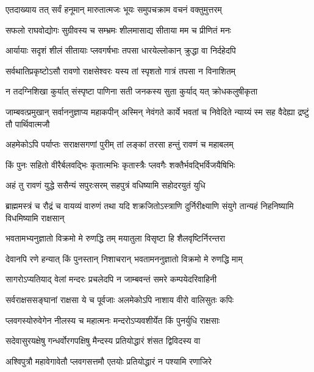 
\twolineshloka
{एतदाख्याय तत् सर्वं हनूमान् मारुतात्मजः}
{भूयः समुपचक्राम वचनं वक्तुमुत्तरम्} %

\twolineshloka
{सफलो राघवोद्योगः सुग्रीवस्य च सम्भ्रमः}
{शीलमासाद्य सीताया मम च प्रीणितं मनः} %

\twolineshloka
{आर्यायाः सदृशं शीलं सीतायाः प्लवगर्षभाः}
{तपसा धारयेल्लोकान् क्रुद्धा वा निर्दहेदपि} %

\twolineshloka
{सर्वथातिप्रकृष्टोऽसौ रावणो राक्षसेश्वरः}
{यस्य तां स्पृशतो गात्रं तपसा न विनाशितम्} %

\twolineshloka
{न तदग्निशिखा कुर्यात् संस्पृष्टा पाणिना सती}
{जनकस्य सुता कुर्याद् यत् क्रोधकलुषीकृता} %

\threelineshloka
{जाम्बवत्प्रमुखान् सर्वाननुज्ञाप्य महाकपीन्}
{अस्मिन् नेवंगते कार्ये भवतां च निवेदिते}
{न्याय्यं स्म सह वैदेह्या द्रष्टुं तौ पार्थिवात्मजौ} %

\twolineshloka
{अहमेकोऽपि पर्याप्तः सराक्षसगणां पुरीम्}
{तां लङ्कां तरसा हन्तुं रावणं च महाबलम्} %

\twolineshloka
{किं पुनः सहितो वीरैर्बलवद्भिः कृतात्मभिः}
{कृतास्त्रैः प्लवगैः शक्तैर्भवद्भिर्विजयैषिभिः} %

\twolineshloka
{अहं तु रावणं युद्धे ससैन्यं सपुरःसरम्}
{सहपुत्रं वधिष्यामि सहोदरयुतं युधि} %

\threelineshloka
{ब्राह्ममस्त्रं च रौद्रं च वायव्यं वारुणं तथा}
{यदि शक्रजितोऽस्त्राणि दुर्निरीक्ष्याणि संयुगे}
{तान्यहं निहनिष्यामि विधमिष्यामि राक्षसान्} %

\twolineshloka
{भवतामभ्यनुज्ञातो विक्रमो मे रुणद्धि तम्}
{मयातुला विसृष्टा हि शैलवृष्टिर्निरन्तरा} %

\twolineshloka
{देवानपि रणे हन्यात् किं पुनस्तान् निशाचरान्}
{भवतामननुज्ञातो विक्रमो मे रुणद्धि माम्} %

\twolineshloka
{सागरोऽप्यतियाद् वेलां मन्दरः प्रचलेदपि}
{न जाम्बवन्तं समरे कम्पयेदरिवाहिनी} %

\twolineshloka
{सर्वराक्षससङ्घानां राक्षसा ये च पूर्वजाः}
{अलमेकोऽपि नाशाय वीरो वालिसुतः कपिः} %

\twolineshloka
{प्लवगस्योरुवेगेन नीलस्य च महात्मनः}
{मन्दरोऽप्यवशीर्येत किं पुनर्युधि राक्षसाः} %

\twolineshloka
{सदेवासुरयक्षेषु गन्धर्वोरगपक्षिषु}
{मैन्दस्य प्रतियोद्धारं शंसत द्विविदस्य वा} %

\twolineshloka
{अश्विपुत्रौ महावेगावेतौ प्लवगसत्तमौ}
{एतयोः प्रतियोद्धारं न पश्यामि रणाजिरे} %

